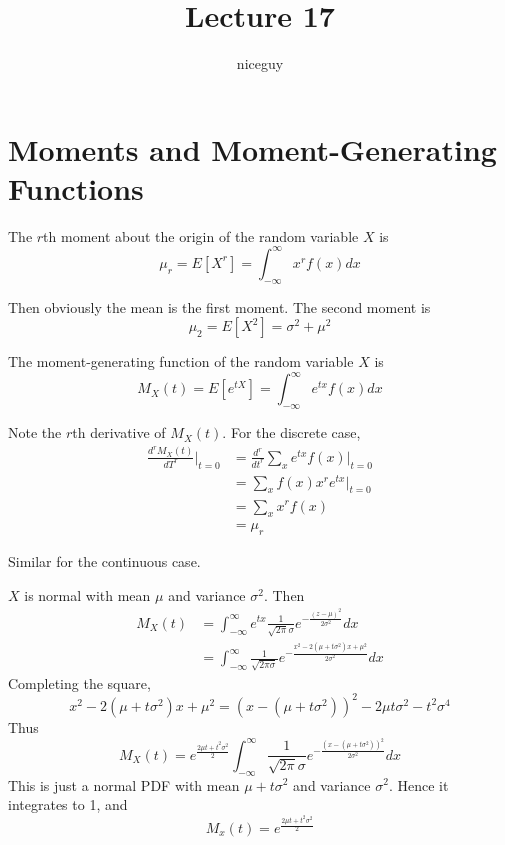 \documentclass[12pt]{article}
\author{niceguy}
\title{Lecture 17}
\begin{document}
\maketitle

\section{Moments and Moment-Generating Functions}

\begin{defn}
	The $r$th moment about the origin of the random variable $X$ is
	$$\mu_r = E[X^r] = \int_{-\infty}^\infty x^rf(x)dx$$
\end{defn}

Then obviously the mean is the first moment. The second moment is
$$\mu_2 = E[X^2] = \sigma^2 + \mu^2$$

\begin{defn}
	The moment-generating function of the random variable $X$ is
	$$M_X(t) = E[e^{tX}] = \int_{-\infty}^\infty e^{tx}f(x)dx$$
\end{defn}

Note the $r$th derivative of $M_X(t)$. For the discrete case,
\begin{align*}
	\frac{d^rM_X(t)}{dT^r} \Bigg |_{t=0} &= \frac{d^r}{dt^r} \sum_x e^{tx}f(x) \Bigg |_{t=0} \\
					     &= \sum_x f(x)x^re^{tx} \Big |_{t=0} \\
					     &= \sum_xx^rf(x) \\
					     &= \mu_r
\end{align*}

Similar for the continuous case.

\begin{ex}
	$X$ is normal with mean $\mu$ and variance $\sigma^2$. Then
	\begin{align*}
		M_X(t) &= \int_{-\infty}^\infty e^{tx} \frac{1}{\sqrt{2\pi}\sigma}e^{-\frac{(z-\mu)^2}{2\sigma^2}}dx \\
		       &= \int_{-\infty}^\infty \frac{1}{\sqrt{2\pi\sigma}}e^{-\frac{x^2-2(\mu+t\sigma^2)x+\mu^2}{2\sigma^2}}dx
	\end{align*}
	Completing the square,
	$$x^2-2(\mu+t\sigma^2)x+\mu^2 = (x-(\mu+t\sigma^2))^2 - 2\mu t\sigma^2 -t^2\sigma^4$$
	Thus
	$$M_X(t) = e^{\frac{2\mu t + t^2\sigma^2}{2}} \int_{-\infty}^\infty \frac{1}{\sqrt{2\pi}\sigma} e^{-\frac{(x-(\mu+t\sigma^2))^2}{2\sigma^2}}dx$$
	This is just a normal PDF with mean $\mu+t\sigma^2$ and variance $\sigma^2$. Hence it integrates to 1, and
	$$M_x(t) = e^{\frac{2\mu t+t^2\sigma^2}{2}}$$
\end{ex}
\end{document}
